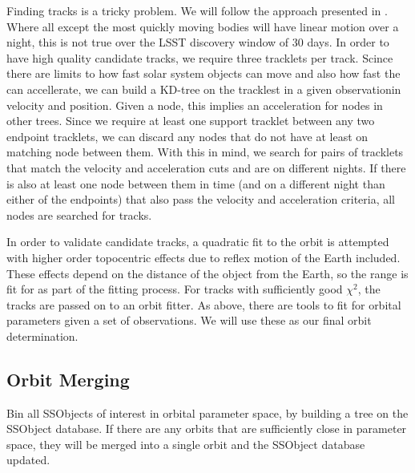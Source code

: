 Finding tracks is a tricky problem.  We will follow the approach presented in \cite{kubica05}.  Where all except the most quickly moving bodies will have linear motion over a night, this is not true over the LSST discovery window of 30 days.  In order to have high quality candidate tracks, we require three tracklets per track.  Scince there are limits to how fast solar system objects can move and also how fast the can accellerate, we can build a KD-tree on the tracklest in a given observationin velocity and position.  Given a node, this implies an acceleration for nodes in other trees.  Since we require at least one support tracklet between any two endpoint tracklets, we can discard any nodes that do not have at least on matching node between them.  With this in mind, we search for pairs of tracklets that match the velocity and acceleration cuts and are on different nights.  If there is also at least one node between them in time (and on a different night than either of the endpoints) that also pass the velocity and acceleration criteria, all nodes are searched for tracks.

In order to validate candidate tracks, a quadratic fit to the orbit is attempted with higher order topocentric effects due to reflex motion of the Earth included.  These effects depend on the distance of the object from the Earth, so the range is fit for as part of the fitting process.  For tracks with sufficiently good $\chi^2$, the tracks are passed on to an orbit fitter.  As above, there are tools to fit for orbital parameters given a set of observations.  We will use these as our final orbit determination.

\subsection{Orbit Merging}
\label{sec:acOrbitMerging}
Bin all SSObjects of interest in orbital parameter space, by building a tree on the SSObject database.  If there are any orbits that are sufficiently close in parameter space, they will be merged into a single orbit and the SSObject database updated.
